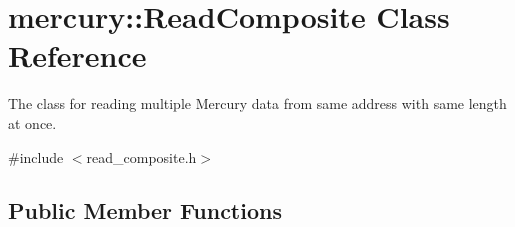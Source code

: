 \hypertarget{classmercury_1_1_read_composite}{}\section{mercury\+:\+:Read\+Composite Class Reference}
\label{classmercury_1_1_read_composite}


The class for reading multiple Mercury data from same address with same length at once.  




{\ttfamily \#include $<$read\+\_\+composite.\+h$>$}

\subsection*{Public Member Functions}
